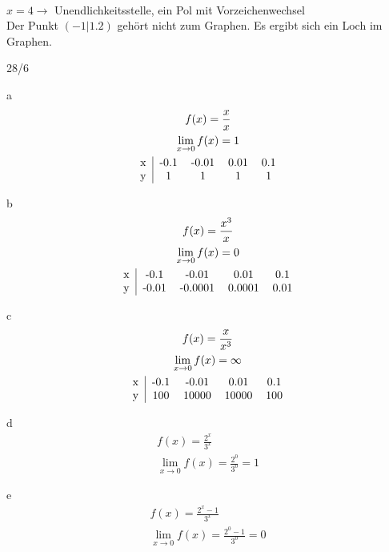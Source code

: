  \\
$x = 4 \rightarrow$ Unendlichkeitsstelle, ein Pol mit Vorzeichenwechsel \\
Der Punkt $(-1|1.2)$ gehört nicht zum Graphen. Es ergibt sich ein Loch im Graphen.
\begin{exercise}{28/6}
  \item [a]
  \begin{gather*}
    f(x) = \frac{x}{x} \\
    \lim\limits_{x \to 0} f(x) = 1 \\
    \begin{tabular}{c|cccc}
      x & -0.1 & -0.01 & 0.01 & 0.1 \\
      y & 1 & 1 & 1 & 1
    \end{tabular}
  \end{gather*}
  \item [b]
  \begin{gather*}
    f(x) = \frac{x^3}{x} \\
    \lim\limits_{x \to 0} f(x) = 0 \\
    \begin{tabular}{c|cccc}
      x & -0.1 & -0.01 & 0.01 & 0.1 \\
      y & -0.01 & -0.0001 & 0.0001 & 0.01
    \end{tabular}
  \end{gather*}
  \item [c]
  \begin{gather*}
    f(x) = \frac{x}{x^3} \\
    \lim\limits_{x \to 0} f(x) = \infty \\
    \begin{tabular}{c|cccc}
      x & -0.1 & -0.01 & 0.01 & 0.1 \\
      y & 100 & 10000 & 10000 & 100
    \end{tabular}
  \end{gather*}
  \item [d]
  \begin{gather*}
    f(x) = \frac{2^x}{3^x} \\
    \lim\limits_{x \to 0} f(x) = \frac{2^0}{3^0} = 1
  \end{gather*}
  \item [e]
  \begin{gather*}
    f(x) = \frac{2^x - 1}{3^x} \\
    \lim\limits_{x \to 0} f(x) = \frac{2^0 - 1}{3^0} = 0
  \end{gather*}
\end{exercise}

